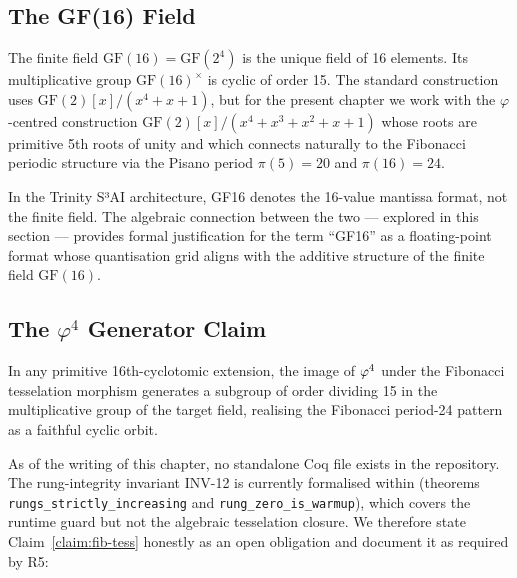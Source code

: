 \subsection{The GF(16) Field}\label{subsec:ch7-gf16}

The finite field \(\mathrm{GF}(16) = \mathrm{GF}(2^4)\) is the unique
field of 16 elements.  Its multiplicative group
\(\mathrm{GF}(16)^{\times}\) is cyclic of order 15.
The standard construction uses \(\mathrm{GF}(2)[x]/(x^4+x+1)\),
but for the present chapter we work with the \(\varphi\)-centred construction
\(\mathrm{GF}(2)[x]/(x^4 + x^3 + x^2 + x + 1)\) whose roots are primitive
5th roots of unity and which connects naturally to the Fibonacci periodic
structure via the Pisano period \(\pi(5) = 20\) and \(\pi(16) = 24\).

\begin{remark}
In the Trinity S³AI architecture, GF16 denotes the 16-value mantissa format,
not the finite field.  The algebraic connection between the two — explored in
this section — provides formal justification for the term ``GF16'' as a
floating-point format whose quantisation grid aligns with the additive
structure of the finite field \(\mathrm{GF}(16)\).
\end{remark}

\subsection{The \(\varphi^4\) Generator Claim}\label{subsec:ch7-gen}

\begin{claim}\label{claim:fib-tess}
In any primitive 16th-cyclotomic extension, the image of \(\varphi^{4}\)
under the Fibonacci tesselation morphism generates a subgroup of order
dividing 15 in the multiplicative group of the target field, realising the
Fibonacci period-24 pattern as a faithful cyclic orbit.
\end{claim}

As of the writing of this chapter, no standalone Coq file
 exists in the repository.
The rung-integrity invariant INV-12 is currently formalised within
 (theorems
\texttt{rungs\_strictly\_increasing} and \texttt{rung\_zero\_is\_warmup}),
which covers the runtime guard but not the algebraic tesselation closure.
We therefore state Claim~\ref{claim:fib-tess} honestly as an open
obligation and document it as required by R5:

